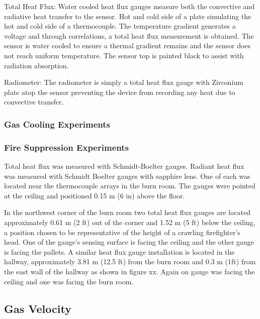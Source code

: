 \documentclass[12pt,oneside]{book}
\begin{document}
Total Heat Flux:
Water cooled heat flux gauges measure both the convective and radiative heat transfer to the sensor.  Hot and cold side of a plate simulating the hot and cold side of a thermocouple.  The temperature gradient generates a voltage and through correlations, a total heat flux measurement is obtained.  The sensor is water cooled to ensure a thermal gradient remains and the sensor does not reach uniform temperature.  The sensor top is painted black to assist with radiation absorption.

Radiometer:
The radiometer is simply a total heat flux gauge with Zirconium plate atop the sensor preventing the device from recording any heat due to convective transfer.

\subsubsection{Gas Cooling Experiments}
\label{subsubsec:Gas_Cooling_Heat_Flux_Instrumentation}

\subsubsection{Fire Suppression Experiments}
\label{subsubsec:Fire_Suppression_Heat_Flux_Instrumentation}

Total heat flux was measured with Schmidt-Boelter gauges.  Radiant heat flux was measured with Schmidt Boelter gauges with sapphire lens.  One of each was located near the thermocouple arrays in the burn room.  The gauges were pointed at the ceiling and positioned 0.15 m (6 in) above the floor.  

In the northwest corner of the burn room two total heat flux gauges are located approximately 0.61 m (2 ft) out of the corner and 1.52 m (5 ft) below the ceiling, a position chosen to be representative of the height of a crawling firefighter's head.  One of the gauge's sensing surface is facing the ceiling and the other gauge is facing the pallets.  A similar heat flux gauge installation is located in the hallway, approximately 3.81 m (12.5 ft) from the burn room and 0.3 m (1ft) from the east wall of the hallway as shown in figure xx.  Again on gauge was facing the ceiling and one was facing the burn room.  

\subsection{Gas Velocity}
\label{subsec:Gas_Velocity}
\end{document}
